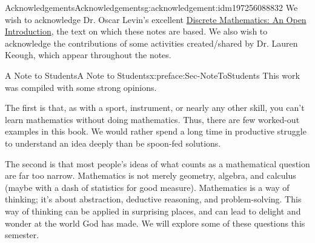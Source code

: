 \documentclass[oneside,10pt,]{book}
\numberwithin{equation}{section}
\begin{document}
\null\clearpage
%
%
\typeout{************************************************}
\typeout{************************************************}
%
\begin{acknowledgement}{Acknowledgements}{}{Acknowledgements}{}{}{g:acknowledgement:idm197256088832}
We wish to acknowledge Dr. Oscar Levin's excellent \href{http://discrete.openmathbooks.org/dmoi3.html}{Discrete Mathematics: An Open Introduction}, the text on which these notes are based. We also wish to acknowledge the contributions of some activities created\slash{}shared by Dr. Lauren Keough, which appear throughout the notes.%
\end{acknowledgement}
%
%
\typeout{************************************************}
\typeout{************************************************}
%
\begin{preface}{A Note to Students}{}{A Note to Students}{}{}{x:preface:Sec-NoteToStudents}
This work was compiled with some strong opinions.%
\par
The first is that, as with a sport, instrument, or nearly any other skill, you can't learn mathematics without doing mathematics. Thus, there are few worked-out examples in this book. We would rather spend a long time in productive struggle to understand an idea deeply than be spoon-fed solutions.%
\par
The second is that most people's ideas of what counts as a mathematical question are far too narrow. Mathematics is not merely geometry, algebra, and calculus (maybe with a dash of statistics for good measure). Mathematics is a way of thinking; it's about abstraction, deductive reasoning, and problem-solving. This way of thinking can be applied in surprising places, and can lead to delight and wonder at the world God has made. We will explore some of these questions this semester.%
\end{preface}
\setcounter{tocdepth}{1}
\renewcommand*\contentsname{Contents}
\tableofcontents
\mainmatter
%
%
\typeout{************************************************}
\typeout{************************************************}
%
\end{document}

